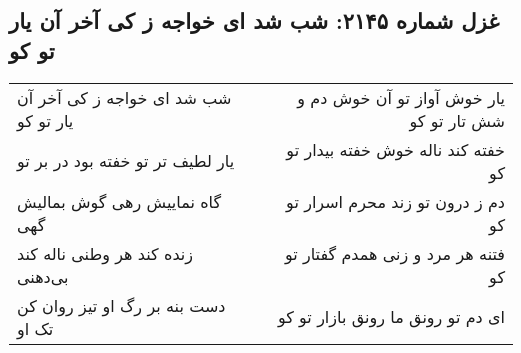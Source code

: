 \begin{center}
\section*{غزل شماره ۲۱۴۵: شب شد ای خواجه ز کی آخر آن یار تو کو}
\label{sec:2145}
\begin{longtable}{l p{0.5cm} r}
شب شد ای خواجه ز کی آخر آن یار تو کو
&&
یار خوش آواز تو آن خوش دم و شش تار تو کو
\\
یار لطیف تر تو خفته بود در بر تو
&&
خفته کند ناله خوش خفته بیدار تو کو
\\
گاه نماییش رهی گوش بمالیش گهی
&&
دم ز درون تو زند محرم اسرار تو کو
\\
زنده کند هر وطنی ناله کند بی‌دهنی
&&
فتنه هر مرد و زنی همدم گفتار تو کو
\\
دست بنه بر رگ او تیز روان کن تک او
&&
ای دم تو رونق ما رونق بازار تو کو
\\
\end{longtable}
\end{center}
